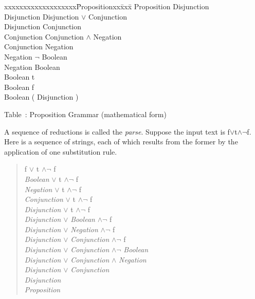 \begin{samepage}
\begin{em}
\begin{tabbing}
xxxxxxxxxxxxxxxxxxx\=Propositionxx\=xxx\=\kill
\>Proposition \>\la\> Disjunction                        \\        
\>Disjunction \>\la\> Disjunction $\vee$ Conjunction     \\
\>Disjunction \>\la\> Conjunction                        \\
\>Conjunction \>\la\> Conjunction $\wedge$ Negation      \\
\>Conjunction \>\la\> Negation                           \\
\>Negation    \>\la\> $\neg$ Boolean                     \\
\>Negation    \>\la\> Boolean                            \\
\>Boolean     \>\la\> {\rm t}                            \\
\>Boolean     \>\la\> {\rm f}                            \\
\>Boolean     \>\la\> {\rm(} Disjunction {\rm)}
\end{tabbing}
\end{em}

\begin{center}
Table~\thetable: Proposition Grammar (mathematical form)
\end{center}
\end{samepage}

A sequence of reductions is called the {\em parse}.
Suppose the input text is f$\vee$t$\wedge\neg$f.  
Here is a sequence of strings, each of which results from the former
by the application of one substitution rule.  

\begin{small}
  \begin{quote} \raggedright
    f $\vee$ t $\wedge \neg$ f\\
    {\em Boolean} $\vee$ t $\wedge \neg$ f\\
    {\em Negation} $\vee$ t $\wedge \neg$ f\\
    {\em Conjunction} $\vee$ t $\wedge \neg$ f\\
    {\em Disjunction} $\vee$ t $\wedge \neg$ f\\
    {\em Disjunction} $\vee$ {\em Boolean} $\wedge \neg$ f\\
    {\em Disjunction} $\vee$ {\em Negation} $\wedge \neg$ f\\
    {\em Disjunction} $\vee$ {\em Conjunction} $\wedge \neg$ f\\
    {\em Disjunction} $\vee$ {\em Conjunction} $\wedge \neg$ {\em Boolean}\\
    {\em Disjunction} $\vee$ {\em Conjunction} $\wedge$ {\em Negation}\\
    {\em Disjunction} $\vee$ {\em Conjunction}\\
    {\em Disjunction}\\
    {\em Proposition}
  \end{quote}
\end{small}

